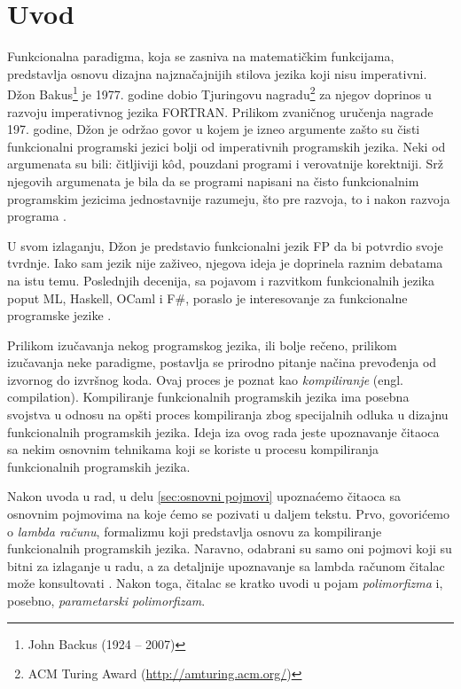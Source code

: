 \section{Uvod}
\label{sec:uvod}

Funkcionalna paradigma, koja se zasniva na matematičkim funkcijama, predstavlja osnovu dizajna najznačajnijih stilova jezika koji nisu imperativni. Džon Bakus\footnote{John Backus (1924 -- 2007)} je 1977. godine dobio Tjuringovu nagradu\footnote{ACM Turing Award (\url{http://amturing.acm.org/})} za njegov doprinos u razvoju imperativnog jezika FORTRAN. Prilikom zvaničnog uručenja nagrade 197. godine, Džon je održao govor u kojem je izneo argumente zašto su čisti funkcionalni programski jezici bolji od imperativnih programskih jezika. Neki od argumenata su bili: čitljiviji k\^od, pouzdani programi i verovatnije korektniji. Srž njegovih argumenata je bila da se programi napisani na čisto funkcionalnim programskim jezicima jednostavnije razumeju, što pre razvoja, to i nakon razvoja programa \cite{Can-Programming-Be-Liberated-from-the-von-Neumann-Style?, Concepts-of-Programming-Languages}.

U svom izlaganju, Džon je predstavio funkcionalni jezik FP da bi potvrdio svoje tvrdnje. Iako sam jezik nije zaživeo, njegova ideja je doprinela raznim debatama na istu temu. Poslednjih decenija, sa pojavom i razvitkom funkcionalnih jezika poput ML, Haskell, OCaml i F\#, poraslo je interesovanje za funkcionalne programske jezike \cite{Concepts-of-Programming-Languages}.

Prilikom izučavanja nekog programskog jezika, ili bolje rečeno, prilikom izučavanja neke paradigme, postavlja se prirodno pitanje načina prevođenja od izvornog do izvršnog koda. Ovaj proces je poznat kao \textit{kompiliranje} (engl. compilation). Kompiliranje funkcionalnih programskih jezika ima posebna svojstva u odnosu na opšti proces kompiliranja zbog specijalnih odluka u dizajnu funkcionalnih programskih jezika. Ideja iza ovog rada jeste upoznavanje čitaoca sa nekim osnovnim tehnikama koji se koriste u procesu kompiliranja funkcionalnih programskih jezika.

Nakon uvoda u rad, u delu \ref{sec:osnovni pojmovi} upoznaćemo čitaoca sa osnovnim pojmovima na koje ćemo se pozivati u daljem tekstu. Prvo, govorićemo o \textit{lambda računu}, formalizmu koji predstavlja osnovu za kompiliranje funkcionalnih programskih jezika. Naravno, odabrani su samo oni pojmovi koji su bitni za izlaganje u radu, a za detaljnije upoznavanje sa lambda računom čitalac može konsultovati \cite{Introduction-to-Combinators-and-Lambda-Calculus}. Nakon toga, čitalac se kratko uvodi u pojam \textit{polimorfizma} i, posebno, \textit{parametarski polimorfizam}.

